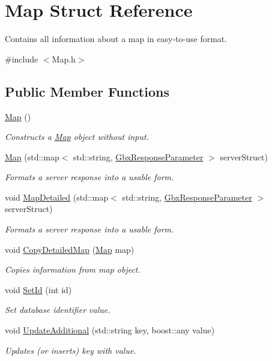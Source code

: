 \hypertarget{structMap}{\section{Map Struct Reference}
\label{structMap}
}


Contains all information about a map in easy-\/to-\/use format.  




{\ttfamily \#include $<$Map.\-h$>$}

\subsection*{Public Member Functions}
\begin{DoxyCompactItemize}
\item 
\hypertarget{structMap_a0f5ad0fd4563497b4214038cbca8b582}{\hyperlink{structMap_a0f5ad0fd4563497b4214038cbca8b582}{Map} ()}\label{structMap_a0f5ad0fd4563497b4214038cbca8b582}

\begin{DoxyCompactList}\small\item\em Constructs a \hyperlink{structMap}{Map} object without input. \end{DoxyCompactList}\item 
\hyperlink{structMap_a95a2cda9b2746b5ba75e811930559c1f}{Map} (std\-::map$<$ std\-::string, \hyperlink{classGbxResponseParameter}{Gbx\-Response\-Parameter} $>$ server\-Struct)
\begin{DoxyCompactList}\small\item\em Formats a server response into a usable form. \end{DoxyCompactList}\item 
void \hyperlink{structMap_ac8e78e5d9ba3951db798736fc33e907e}{Map\-Detailed} (std\-::map$<$ std\-::string, \hyperlink{classGbxResponseParameter}{Gbx\-Response\-Parameter} $>$ server\-Struct)
\begin{DoxyCompactList}\small\item\em Formats a server response into a usable form. \end{DoxyCompactList}\item 
void \hyperlink{structMap_aceca3c7bca81223e4b54de1cc91f7a31}{Copy\-Detailed\-Map} (\hyperlink{structMap}{Map} map)
\begin{DoxyCompactList}\small\item\em Copies information from map object. \end{DoxyCompactList}\item 
void \hyperlink{structMap_af83b3a784e6fa9404c1940a2ca1b68a8}{Set\-Id} (int id)
\begin{DoxyCompactList}\small\item\em Set database identifier value. \end{DoxyCompactList}\item 
void \hyperlink{structMap_ab745d995eff65ccbd114f3c43a7cbf1f}{Update\-Additional} (std\-::string key, boost\-::any value)
\begin{DoxyCompactList}\small\item\em Updates (or inserts) key with value. \end{DoxyCompactList}\end{DoxyCompactItemize}
